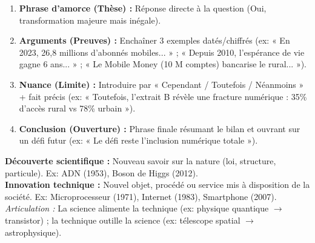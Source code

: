 \documentclass[11pt]{article}
\begin{document}
\begin{methode}
\begin{enumerate}
    \item \textbf{Phrase d'amorce (Thèse) :} Réponse directe à la question (Oui, transformation majeure mais inégale).
    \item \textbf{Arguments (Preuves) :} Enchaîner 3 exemples datés/chiffrés (ex: « En 2023, 26,8 millions d'abonnés mobiles... » ; « Depuis 2010, l'espérance de vie gagne 6 ans... » ; « Le Mobile Money (10 M comptes) bancarise le rural... »).
    \item \textbf{Nuance (Limite) :} Introduire par « Cependant / Toutefois / Néanmoins » + fait précis (ex: « Toutefois, l'extrait B révèle une fracture numérique : 35\% d'accès rural vs 78\% urbain »).
    \item \textbf{Conclusion (Ouverture) :} Phrase finale résumant le bilan et ouvrant sur un défi futur (ex: « Le défi reste l'inclusion numérique totale »).
\end{enumerate}
\end{methode}

\begin{aretenir}
\textbf{Découverte scientifique :} Nouveau savoir sur la nature (loi, structure, particule). Ex: ADN (1953), Boson de Higgs (2012).\\
\textbf{Innovation technique :} Nouvel objet, procédé ou service mis à disposition de la société. Ex: Microprocesseur (1971), Internet (1983), Smartphone (2007).\\
\emph{Articulation :} La science alimente la technique (ex: physique quantique $\to$ transistor) ; la technique outille la science (ex: télescope spatial $\to$ astrophysique).
\end{aretenir}
\end{document}
